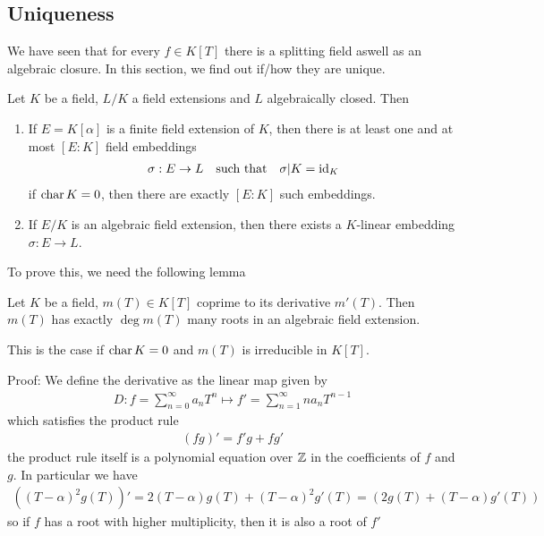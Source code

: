 \subsection{Uniqueness}

We have seen that for every $f \in K[T]$ there is a splitting field aswell as an algebraic closure. 
In this section, we find out if/how they are unique.

\begin{theorem}[]
	Let $K$ be a field, $L/K$ a field extensions and $L$ algebraically closed. Then
	\begin{enumerate}
		\item If $E = K[\alpha]$ is a finite field extension of $K$, then there is at least one and at most $[E:K]$ field embeddings
		\begin{align*}
			\sigma: E \to L \quad \text{such that} \quad \sigma|K = \operatorname{id}_K
		\end{align*}	
		if $\operatorname{char} K = 0$, then there are exactly $[E:K]$ such embeddings.
	\item If $E/K$ is an algebraic field extension, then there exists a $K$-linear embedding $\sigma: E \to L$.
	\end{enumerate}
\end{theorem}

To prove this, we need the following lemma
\begin{lemma}[]
	Let $K$ be a field, $m(T) \in K[T]$ coprime to its derivative $m'(T)$. Then $m(T)$ has exactly $\deg m(T)$ many roots in an algebraic field extension.

	This is the case if $\operatorname{char} K = 0$ and $m(T)$ is irreducible in $K[T]$.
\end{lemma}

Proof: We define the derivative as the linear map given by
\begin{align*}
	D: f = \sum_{n=0}^{\infty}a_n T^{n} \mapsto f' = \sum_{n=1}^{\infty}n a_n T^{n-1}
\end{align*}
which satisfies the product rule
\begin{align*}
	(f g)' = f'g + fg'
\end{align*}
the product rule itself is a polynomial equation over $\mathbb{Z}$ in the coefficients of $f$ and $g$. In particular we have
\begin{align*}
	\left(
		(T- \alpha)^{2} g(T)
	\right)'
	=
	2(T - \alpha)g(T) + (T - \alpha)^{2}g'(T)
	=
	\left(
		2g(T) + (T - \alpha) g'(T)
	\right)
\end{align*}
so if $f$ has a root with higher multiplicity, then it is also a root of $f'$


